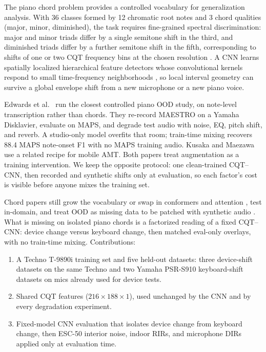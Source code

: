 \documentclass[pdflatex,sn-mathphys-num,iicol]{sn-jnl}
\theoremstyle{thmstyleone}
\theoremstyle{thmstyletwo}
\theoremstyle{thmstylethree}
\begin{document}
The piano chord problem provides a controlled vocabulary for generalization analysis. With 36 classes formed by 12 chromatic root notes and 3 chord qualities (major, minor, diminished), the task requires fine-grained spectral discrimination: major and minor triads differ by a single semitone shift in the third, and diminished triads differ by a further semitone shift in the fifth, corresponding to shifts of one or two CQT frequency bins at the chosen resolution \cite{Harte2010}. A CNN learns spatially localized hierarchical feature detectors whose convolutional kernels respond to small time-frequency neighborhoods \cite{OShea2015}\cite{Purwono2022}, so local interval geometry can survive a global envelope shift from a new microphone or a new piano voice.

Edwards et al.\ \cite{Edwards2024} run the closest controlled piano OOD study, on note-level transcription rather than chords. They re-record MAESTRO on a Yamaha Disklavier, evaluate on MAPS, and degrade test audio with noise, EQ, pitch shift, and reverb. A studio-only model overfits that room; train-time mixing recovers 88.4 MAPS note-onset F1 with no MAPS training audio. Kusaka and Maezawa \cite{Kusaka2024} use a related recipe for mobile AMT. Both papers treat augmentation as a training intervention. We keep the opposite protocol: one clean-trained CQT--CNN, then recorded and synthetic shifts only at evaluation, so each factor's cost is visible before anyone mixes the training set.

Chord papers still grow the vocabulary \cite{Majchrzak2025} or swap in conformers \cite{Akram2025} and attention \cite{Kusaka2024}, test in-domain, and treat OOD as missing data to be patched with synthetic audio \cite{Byambatsogt2020}\cite{Ostermann2023}. What is missing on isolated piano chords is a factorized reading of a fixed CQT--CNN: device change versus keyboard change, then matched eval-only overlays, with no train-time mixing. Contributions:

\begin{enumerate}[1.]
\item A Techno T-9890i training set and five held-out datasets: three device-shift datasets on the same Techno and two Yamaha PSR-S910 keyboard-shift datasets on mics already used for device tests.
\item Shared CQT features ($216 \times 188 \times 1$), used unchanged by the CNN and by every degradation experiment.
\item Fixed-model CNN evaluation that isolates device change from keyboard change, then ESC-50 interior noise, indoor RIRs, and microphone DIRs applied only at evaluation time.
\end{enumerate}
\end{document}
